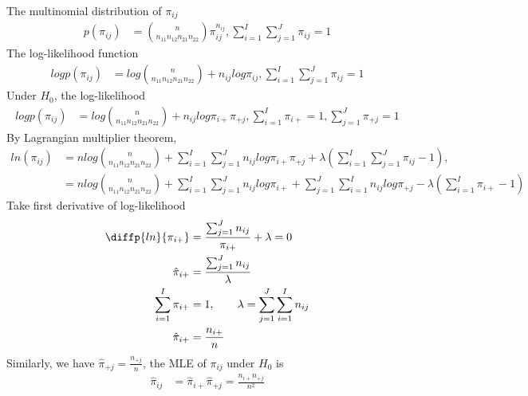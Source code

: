 \documentclass[11pt]{article} %
\begin{document}
\begin{itemize}
The multinomial distribution of $\pi_{ij}$
\begin{align*}
	p(\pi_{ij}) &= {n \choose n_{11} n_{12} n_{21} n_{22}} \pi_{ij}^{n_{ij}} , \sum_{i=1}^I \sum_{j=1}^J \pi_{ij} = 1
\end{align*}
The log-likelihood function
\begin{align*}
	log p(\pi_{ij}) &= log {n \choose n_{11} n_{12} n_{21} n_{22}} +  n_{ij} log \pi_{ij} , \sum_{i=1}^I \sum_{j=1}^J \pi_{ij} = 1
\end{align*}
Under $H_0$, the log-likelihood
\begin{align*}
	log p(\pi_{ij}) &= log {n \choose n_{11} n_{12} n_{21} n_{22}} +  n_{ij} log \pi_{i+} \pi_{+j} , \sum_{i=1}^I \pi_{i+} = 1, \sum_{j=1}^J \pi_{+j} = 1 
\end{align*}
By Lagrangian multiplier theorem,
\begin{align*}
	ln(\pi_{ij}) &=n log {n \choose n_{11} n_{12} n_{21} n_{22}} +\sum_{i=1}^I \sum_{j=1}^J n_{ij} log \pi_{i+} \pi_{+j} + \lambda ( \sum_{i=1}^I \sum_{j=1}^J \pi_{ij} - 1),\\
	&= n log {n \choose n_{11} n_{12} n_{21} n_{22}} +\sum_{i=1}^I \sum_{j=1}^J n_{ij} log \pi_{i+} + \sum_{j=1}^J \sum_{i=1}^I n_{ij} log \pi_{+j} - \lambda ( \sum_{i=1}^I \pi_{i+} - 1)
\end{align*}
Take first derivative of log-likelihood
\begin{align*}
	\diffp{ln}{{\pi_{i+}}} &= \frac{\sum_{j=1}^J n_{ij}}{\pi_{i+}} + \lambda = 0 \\
	\hat{\pi}_{i+} &= \frac{\sum_{j=1}^J n_{ij}}{\lambda}\\
	\sum_{i=1}^I \pi_{i+} &= 1, \qquad \lambda = \sum_{j=1}^J \sum_{i=1}^I n_{ij}\\
	\hat{\pi}_{i+} &= \frac{n_{i+}}{n}
\end{align*}
Similarly, we have $\hat{\pi}_{+j} = \frac{n_{+j}}{n}$, the MLE of $\pi_{ij}$ under $H_0$ is 
\begin{align*}
	\hat{\pi}_{ij} &= \hat{\pi}_{i+} \hat{\pi}_{+j} = \frac{n_{i+} n_{+j}}{n^2}
\end{align*}


\end{itemize}
\end{document}
